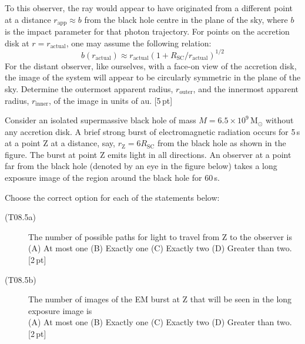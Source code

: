 \begin{description}
  To this observer, the ray would appear to have originated from a different
  point at a distance $r_{\mathrm{app}} \approx b$ from the black hole centre
  in the plane of the sky, where $b$ is the impact parameter for that photon
  trajectory. For points on the accretion disk at $r = r_{\mathrm{actual}}$,
  one may assume the following relation:
  \[ b(r_{\mathrm{actual}}) \approx r_{\mathrm{actual}}
     \left(1 + R_{\mathrm{SC}}/r_{\mathrm{actual}}\right)^{1/2} \]
  For the distant observer, like ourselves, with a face-on view of the
  accretion disk, the image of the system will appear to be circularly
  symmetric in the plane of the sky. Determine the outermost apparent radius,
  $r_{\mathrm{outer}}$, and the innermost apparent radius,
  $r_{\mathrm{inner}}$, of the image in units of au. \hfill[5\,pt]
\item[(T08.5)] Consider an isolated supermassive black hole of mass
  $M = 6.5 \times 10^9\,\mathrm{M}_\odot$ without any accretion disk. A brief
  strong burst of electromagnetic radiation occurs for 5\,s at a point Z at a
  distance, say, $r_{\mathrm{Z}} = 6R_{\mathrm{SC}}$ from the black hole as
  shown in the figure. The burst at point Z emits light in all directions. An
  observer at a point far from the black hole (denoted by an eye in the figure
  below) takes a long exposure image of the region around the black hole for
  60\,s.


  Choose the correct option for each of the statements below:
  \begin{description}
  \item[(T08.5a)] The number of possible paths for light to travel from Z to
    the observer is\\
    (A) At most one \quad (B) Exactly one \quad (C) Exactly two \quad
    (D) Greater than two. \hfill[2\,pt]
  \item[(T08.5b)] The number of images of the EM burst at Z that will be seen
    in the long exposure image is\\
    (A) At most one \quad (B) Exactly one \quad (C) Exactly two \quad
    (D) Greater than two. \hfill[2\,pt]
  \end{description}
\end{description}


